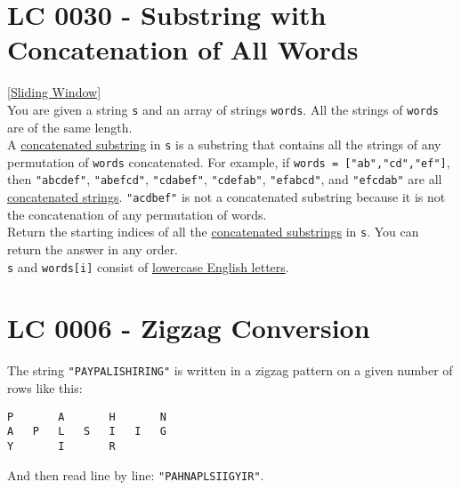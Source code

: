 {\section{LC 0030 - Substring with Concatenation of All Words}\label{lc0030}
{\hyperref[sec:sliding_window]{[Sliding Window]}}\\

You are given a string {\colorbox{CodeBackground}{\lstinline|s|}} and an array of strings {\colorbox{CodeBackground}{\lstinline|words|}}. All the strings of {\colorbox{CodeBackground}{\lstinline|words|}} are of the same length.\\

A \ul{concatenated substring} in {\colorbox{CodeBackground}{\lstinline|s|}} is a substring that contains all the strings of any permutation of {\colorbox{CodeBackground}{\lstinline|words|}} concatenated. For example, if {\colorbox{CodeBackground}{\lstinline|words = ["ab","cd","ef"]|}}, then {\colorbox{CodeBackground}{\lstinline|"abcdef"|}}, {\colorbox{CodeBackground}{\lstinline|"abefcd"|}}, {\colorbox{CodeBackground}{\lstinline|"cdabef"|}}, {\colorbox{CodeBackground}{\lstinline|"cdefab"|}}, {\colorbox{CodeBackground}{\lstinline|"efabcd"|}}, and {\colorbox{CodeBackground}{\lstinline|"efcdab"|}} are all \ul{concatenated strings}. {\colorbox{CodeBackground}{\lstinline|"acdbef"|}} is not a concatenated substring because it is not the concatenation of any permutation of words.\\

Return the starting indices of all the \ul{concatenated substrings} in {\colorbox{CodeBackground}{\lstinline|s|}}. You can return the answer in any order.\\

{\colorbox{CodeBackground}{\lstinline|s|}} and {\colorbox{CodeBackground}{\lstinline|words[i]|}} consist of \ul{lowercase English letters}.

\section{LC 0006 - Zigzag Conversion}
The string {\colorbox{CodeBackground}{\lstinline|"PAYPALISHIRING"|}} is written in a zigzag pattern on a given number of rows like this:
\begin{lstlisting}
P		A		H		N
A	P	L	S	I	I	G
Y		I		R
\end{lstlisting}
And then read line by line: {\colorbox{CodeBackground}{\lstinline|"PAHNAPLSIIGYIR"|}}.\\

}
